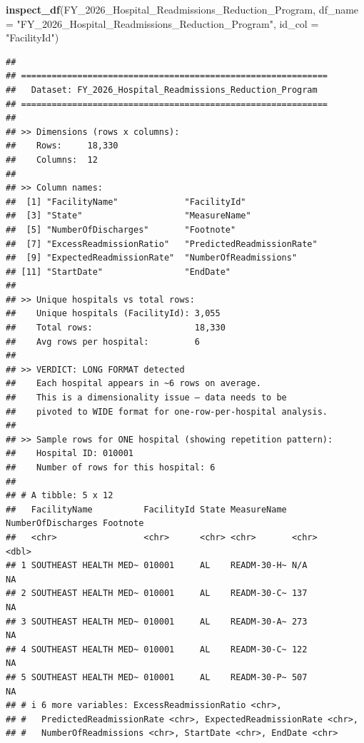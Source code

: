 \documentclass[
]{article}
\newenvironment{Shaded}{\begin{snugshade}}{\end{snugshade}}
\newcommand{\AttributeTok}[1]{\textcolor[rgb]{0.13,0.29,0.53}{#1}}
\newcommand{\FunctionTok}[1]{\textcolor[rgb]{0.13,0.29,0.53}{\textbf{#1}}}
\newcommand{\NormalTok}[1]{#1}
\newcommand{\StringTok}[1]{\textcolor[rgb]{0.31,0.60,0.02}{#1}}
\begin{document}
\begin{Shaded}
\begin{Highlighting}[]
\FunctionTok{inspect\_df}\NormalTok{(FY\_2026\_Hospital\_Readmissions\_Reduction\_Program, }
           \AttributeTok{df\_name =} \StringTok{"FY\_2026\_Hospital\_Readmissions\_Reduction\_Program"}\NormalTok{, }
           \AttributeTok{id\_col  =} \StringTok{"FacilityId"}\NormalTok{)}
\end{Highlighting}
\end{Shaded}

\begin{verbatim}
## 
## ============================================================
##   Dataset: FY_2026_Hospital_Readmissions_Reduction_Program 
## ============================================================
## 
## >> Dimensions (rows x columns):
##    Rows:     18,330 
##    Columns:  12 
## 
## >> Column names:
##  [1] "FacilityName"             "FacilityId"              
##  [3] "State"                    "MeasureName"             
##  [5] "NumberOfDischarges"       "Footnote"                
##  [7] "ExcessReadmissionRatio"   "PredictedReadmissionRate"
##  [9] "ExpectedReadmissionRate"  "NumberOfReadmissions"    
## [11] "StartDate"                "EndDate"                 
## 
## >> Unique hospitals vs total rows:
##    Unique hospitals (FacilityId): 3,055
##    Total rows:                    18,330
##    Avg rows per hospital:         6
## 
## >> VERDICT: LONG FORMAT detected
##    Each hospital appears in ~6 rows on average.
##    This is a dimensionality issue — data needs to be
##    pivoted to WIDE format for one-row-per-hospital analysis.
## 
## >> Sample rows for ONE hospital (showing repetition pattern):
##    Hospital ID: 010001 
##    Number of rows for this hospital: 6 
## 
## # A tibble: 5 x 12
##   FacilityName          FacilityId State MeasureName NumberOfDischarges Footnote
##   <chr>                 <chr>      <chr> <chr>       <chr>                 <dbl>
## 1 SOUTHEAST HEALTH MED~ 010001     AL    READM-30-H~ N/A                      NA
## 2 SOUTHEAST HEALTH MED~ 010001     AL    READM-30-C~ 137                      NA
## 3 SOUTHEAST HEALTH MED~ 010001     AL    READM-30-A~ 273                      NA
## 4 SOUTHEAST HEALTH MED~ 010001     AL    READM-30-C~ 122                      NA
## 5 SOUTHEAST HEALTH MED~ 010001     AL    READM-30-P~ 507                      NA
## # i 6 more variables: ExcessReadmissionRatio <chr>,
## #   PredictedReadmissionRate <chr>, ExpectedReadmissionRate <chr>,
## #   NumberOfReadmissions <chr>, StartDate <chr>, EndDate <chr>
\end{verbatim}
\end{document}
